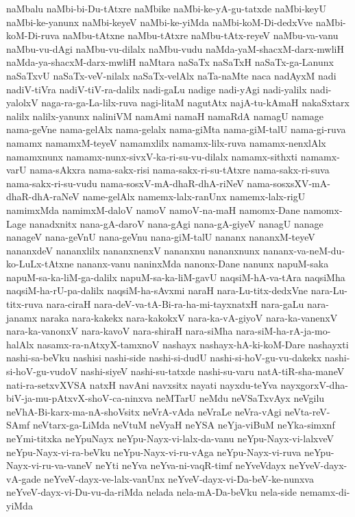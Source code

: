 {naMbalu
naMbi-bi-Du-tAtxre
naMbike
naMbi-ke-yA-gu-tatxde
naMbi-keyU
naMbi-ke-yanunx
naMbi-keyeV
naMbi-ke-yiMda
naMbi-koM-Di-dedxVve
naMbi-koM-Di-ruva
naMbu-tAtxne
naMbu-tAtxre
naMbu-tAtx-reyeV
naMbu-va-vanu
naMbu-vu-dAgi
naMbu-vu-dilalx
naMbu-vudu
naMda-yaM-shacxM-darx-mwliH
naMda-ya-shacxM-darx-mwliH
naMtara
naSaTx
naSaTxH
naSaTx-ga-Lanunx
naSaTxvU
naSaTx-veV-nilalx
naSaTx-velAlx
naTa-naMte
naca
nadAyxM
nadi
nadiV-tiVra
nadiV-tiV-ra-dalilx
nadi-gaLu
nadige
nadi-yAgi
nadi-yalilx
nadi-yalolxV
naga-ra-ga-La-lilx-ruva
nagi-litaM
nagutAtx
najA-tu-kAmaH
nakaSxtarx
nalilx
nalilx-yanunx
naliniVM
namAmi
namaH
namaRdA
namagU
namage
nama-geVne
nama-gelAlx
nama-gelalx
nama-giMta
nama-giM-talU
nama-gi-ruva
namamx
namamxM-teyeV
namamxlilx
namamx-lilx-ruva
namamx-nenxlAlx
namamxnunx
namamx-nunx-sivxV-ka-ri-su-vu-dilalx
namamx-sithxti
namamx-varU
nama-sAkxra
nama-sakx-risi
nama-sakx-ri-su-tAtxre
nama-sakx-ri-suva
nama-sakx-ri-su-vudu
nama-sosxV-mA-dhaR-dhA-riNeV
nama-sosxsXV-mA-dhaR-dhA-raNeV
name-gelAlx
namemx-lalx-ranUnx
namemx-lalx-rigU
namimxMda
namimxM-daloV
namoV
namoV-na-maH‌
namomx-Dane
namomx-Lage
nanadxnitx
nana-gA-daroV
nana-gAgi
nana-gA-giyeV
nanagU
nanage
nanageV
nana-geVnU
nana-geVnu
nana-giM-talU
nananx
nananxM-teyeV
nananxdeV
nananxlilx
nananxnenxV
nananxnu
nananxnunx
nananx-va-neM-du-ko-LuLx-tAtxne
nananx-vanu
naninxMda
nanonx-Dane
nanunx
napuM-saka
napuM-sa-ka-liM-ga-dalilx
napuM-sa-ka-liM-gavU
naqsiM-hA-va-tAra
naqsiMha
naqsiM-ha-rU-pa-dalilx
naqsiM-ha-sAvxmi
naraH
nara-Lu-titx-dedxVne
nara-Lu-titx-ruva
nara-ciraH
nara-deV-va-tA-Bi-ra-ha-mi-tayxnatxH
nara-gaLu
nara-janamx
naraka
nara-kakekx
nara-kakokxV
nara-ka-vA-giyoV
nara-ka-vanenxV
nara-ka-vanonxV
nara-kavoV
nara-shiraH
nara-siMha
nara-siM-ha-rA-ja-mo-halAlx
nasamx-ra-nAtxyX-tamxnoV
nashayx
nashayx-hA-ki-koM-Dare
nashayxti
nashi-sa-beVku
nashisi
nashi-side
nashi-si-dudU
nashi-si-hoV-gu-vu-dakekx
nashi-si-hoV-gu-vudoV
nashi-siyeV
nashi-su-tatxde
nashi-su-varu
natA-tiR-sha-maneV
nati-ra-setxvXVSA
natxH
navAni
navxsitx
nayati
nayxdu-teYva
nayxgorxV-dha-biV-ja-mu-pAtxvX-shoV-ca-ninxva
neMTarU
neMdu
neVSaTxvAyx
neVgilu
neVhA-Bi-karx-ma-nA-shoVsitx
neVrA-vAda
neVraLe
neVra-vAgi
neVta-reV-SAmf
neVtarx-ga-LiMda
neVtuM
neVyaH
neYSA
neYja-viBuM
neYka-simxnf
neYmi-titxka
neYpuNayx
neYpu-Nayx-vi-lalx-da-vanu
neYpu-Nayx-vi-lalxveV
neYpu-Nayx-vi-ra-beVku
neYpu-Nayx-vi-ru-vAga
neYpu-Nayx-vi-ruva
neYpu-Nayx-vi-ru-va-vaneV
neYti
neYva
neYva-ni-vaqR-timf
neYveVdayx
neYveV-dayx-vA-gade
neYveV-dayx-ve-lalx-vanUnx
neYveV-dayx-vi-Da-beV-ke-nunxva
neYveV-dayx-vi-Du-vu-da-riMda
nelada
nela-mA-Da-beVku
nela-side
nemamx-di-yiMda
}
